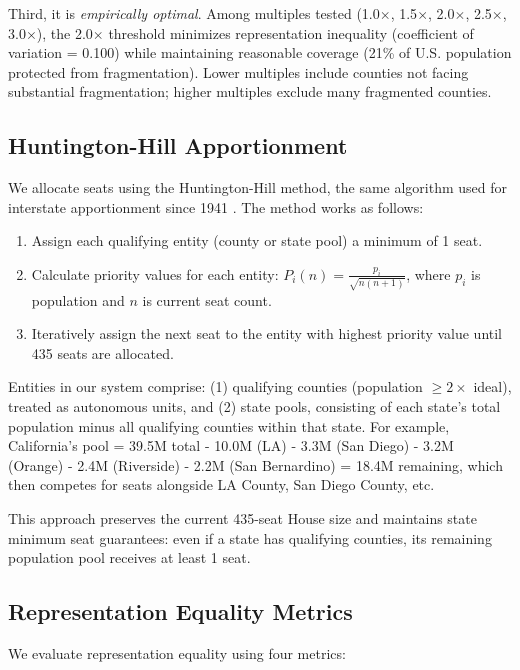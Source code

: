Third, it is \emph{empirically optimal}. Among multiples tested (1.0$\times$, 1.5$\times$, 2.0$\times$, 2.5$\times$, 3.0$\times$), the 2.0$\times$ threshold minimizes representation inequality (coefficient of variation = 0.100) while maintaining reasonable coverage (21\% of U.S. population protected from fragmentation). Lower multiples include counties not facing substantial fragmentation; higher multiples exclude many fragmented counties.

\subsection{Huntington-Hill Apportionment}

We allocate seats using the Huntington-Hill method, the same algorithm used for interstate apportionment since 1941 \citep{balinski2001fair}. The method works as follows:

\begin{enumerate}
\item Assign each qualifying entity (county or state pool) a minimum of 1 seat.
\item Calculate priority values for each entity: $P_i(n) = \frac{p_i}{\sqrt{n(n+1)}}$, where $p_i$ is population and $n$ is current seat count.
\item Iteratively assign the next seat to the entity with highest priority value until 435 seats are allocated.
\end{enumerate}

Entities in our system comprise: (1) qualifying counties (population $\geq 2\times$ ideal), treated as autonomous units, and (2) state pools, consisting of each state's total population minus all qualifying counties within that state. For example, California's pool = 39.5M total - 10.0M (LA) - 3.3M (San Diego) - 3.2M (Orange) - 2.4M (Riverside) - 2.2M (San Bernardino) = 18.4M remaining, which then competes for seats alongside LA County, San Diego County, etc.

This approach preserves the current 435-seat House size and maintains state minimum seat guarantees: even if a state has qualifying counties, its remaining population pool receives at least 1 seat.

\subsection{Representation Equality Metrics}

We evaluate representation equality using four metrics:

